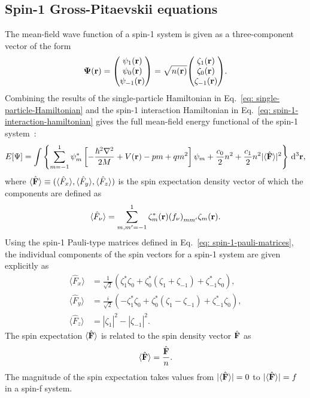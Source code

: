 \subsection{Spin-1 Gross-Pitaevskii equations}\label{subsec: spin-1-gpes}
The mean-field wave function of a spin-1 system is given as a three-component
vector of the form
\begin{align}
    \vb{\Psi}(\vb{r}) = \mqty(\psi_1(\vb{r}) \\ \psi_0(\vb{r}) \\
    \psi_{-1}(\vb{r})) = \sqrt{n(\vb{r})}\mqty(\zeta_1(\vb{r}) \\
    \zeta_{0}(\vb{r}) \\ \zeta_{-1}(\vb{r})).
\end{align}
Combining the results of the single-particle Hamiltonian in
Eq.~\eqref{eq: single-particle-Hamiltonian} and the spin-1 interaction
Hamiltonian in Eq.~\eqref{eq: spin-1-interaction-hamiltonian} gives the
full mean-field energy functional of the spin-1 system~\cite{Kawaguchi2012}:
\begin{align}\label{eq: spin-1-energy-functional}
    E[\Psi] = \int \left\{\sum_{m=-1}^1\psi_m^*\left[-\frac{\hbar^2\nabla^2}{2M}
    + V(\vb{r}) - pm + qm^2\right]\psi_m
    + \frac{c_0}{2}n^2 + \frac{c_1}{2}n^2|\langle \hat{\vb{F}} \rangle |^2 \right\} \, \dd^3\vb{r},
\end{align}
where \(\langle\hat{\vb{F}}\rangle\equiv(\langle\hat{F}_x\rangle,
\langle\hat{F}_y\rangle, \langle\hat{F}_z\rangle)\) is the spin expectation
density vector of which the components are defined as
\begin{align}\label{eq: spin-vector-components}
    \langle\hat{F}_\nu\rangle = \sum_{m,m'=-1}^1 \zeta^*_m(\vb{r}){(f_\nu)}_{mm'}
        \zeta_m(\vb{r}).
\end{align}
Using the spin-1 Pauli-type matrices defined in
Eq.~\eqref{eq: spin-1-pauli-matrices}, the individual components of the spin
vectors for a spin-1 system are given explicitly as
\begin{align}\label{eq: spin-1-spin-vectors}
    \langle\hat{F}_x\rangle &= \frac{1}{\sqrt{2}} \left(\zeta_1^*\zeta_0
    + \zeta_0^*(\zeta_1+\zeta_{-1}) + \zeta_{-1}^*\zeta_0\right), \\
    \langle\hat{F}_y\rangle &= \frac{i}{\sqrt{2}}\left(-\zeta_1^*\zeta_0
    + \zeta_0^*(\zeta_1-\zeta_{-1}) +\zeta_{-1}^*\zeta_0\right), \\
    \langle\hat{F}_z\rangle &= |\zeta_1|^2-|\zeta_{-1}|^2.
\end{align}
The spin expectation \(\langle\hat{\vb{F}}\rangle\) is related to the spin
density vector \(\hat{\vb{F}}\) as
\begin{align}
    \langle\hat{\vb{F}}\rangle = \frac{\hat{\vb{F}}}{n}.
\end{align}
The magnitude of the spin expectation takes values from \(|\langle \hat{\vb{F}} \rangle |=0\) to
\(|\langle \hat{\vb{F}} \rangle |=f\) in a spin-f system.

